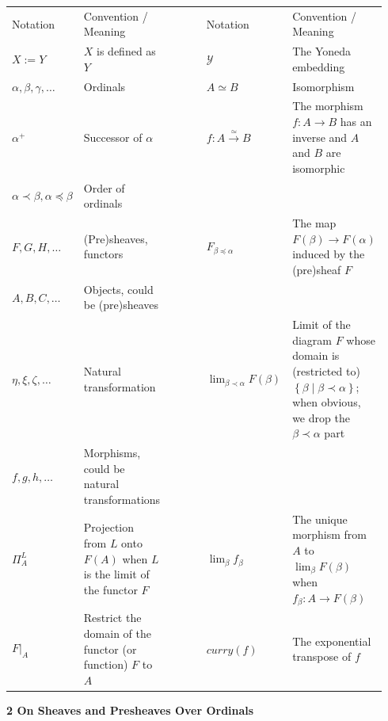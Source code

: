\begin{center}\begin{tabular}{p{0.188\linewidth}p{0.188\linewidth}p{0.188\linewidth}p{0.188\linewidth}p{0.188\linewidth}}Notation & Convention / Meaning &  & Notation & Convention / Meaning\\$X:=Y$ & $X$ is defined as $Y$ &  & $\mathcal{Y}$ & The Yoneda embedding\\$\alpha,\beta,\gamma,\dots$ & Ordinals &  & $A\simeq B$ & Isomorphism\\${\alpha}^{+}$ & Successor of $\alpha$ &  & $f:A\xrightarrow{\simeq}B$ & The morphism $f:A\to B$ has an inverse and $A$ and $B$ are isomorphic\\$\alpha\prec\beta,\alpha\preceq\beta$ & Order of ordinals & \\$F,G,H,\dots$ & (Pre)sheaves, functors &  & $F_{\beta\preceq\alpha}$ & The map $F(\beta)\to F(\alpha)$  induced by the (pre)sheaf $F$\\$A,B,C,\dots$ & Objects, could be (pre)sheaves & \\$\eta,\xi,\zeta,\dots$ & Natural transformation &  & $\displaystyle\lim_{\beta\prec\alpha}F(\beta)$ & Limit of the diagram $F$ whose domain is (restricted to) $\left\{\beta\middle|\beta\prec\alpha\right\}$; when obvious, we drop the $\beta\prec\alpha$ part\\$f,g,h,\dots$ & Morphisms, could be natural transformations & \\$\Pi^{L}_{A}$ & Projection from $L$ onto $F(A)$ when $L$ is the limit of the functor $F$ &  & $\displaystyle\lim_{\beta}f_{\beta}$ & The unique morphism from $A$ to $\displaystyle\lim_{\beta}F(\beta)$ when $f_{\beta}:A\to F(\beta)$\\${\left.F\right|}_{A}$ & Restrict the domain of the functor (or function) $F$ to $A$ &  & $\mathit{curry}\left(f\right)$ & The exponential transpose of $f$\end{tabular}\end{center}
 
 
 
 


 
\par\medskip\noindent\textbf{2 On Sheaves and Presheaves Over Ordinals}\par
 
 
